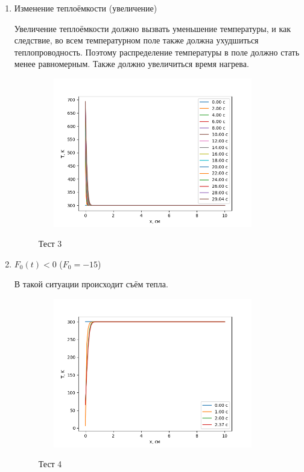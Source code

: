 \begin{enumerate}
\begin{enumerate}
\newpage

	\item Изменение теплоёмкости (увеличение)

	Увеличение теплоёмкости должно вызвать уменьшение температуры, и как следствие, во всем температурном поле также должна ухудшиться теплопроводность. Поэтому распределение температуры в поле должно стать менее равномерным. Также должно увеличиться время нагрева. 
	\begin{figure}[h]
		\begin{center}
			{\includegraphics[height=6.5cm, width = 10cm]{../pictures/Figure_6}}
			\caption{Тест 3}
		\end{center}
	\end{figure}

\newpage

	\item $F_0(t) < 0$ ($F_0 = -15$)
	
	В такой ситуации происходит съём тепла.
	\begin{figure}[h]
		\begin{center}
			{\includegraphics[height=6.5cm, width = 10cm]{../pictures/Figure_4}}
			\caption{Тест 4}
		\end{center}
	\end{figure}

	
\end{enumerate}
\end{enumerate}








